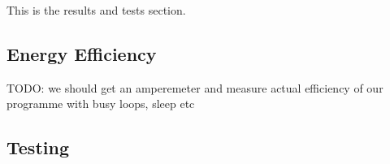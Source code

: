 
This is the results and tests section.

\subsection{Energy Efficiency}

TODO: we should get an amperemeter and measure actual efficiency of our programme with busy loops, sleep etc

\subsection{Testing}

	
